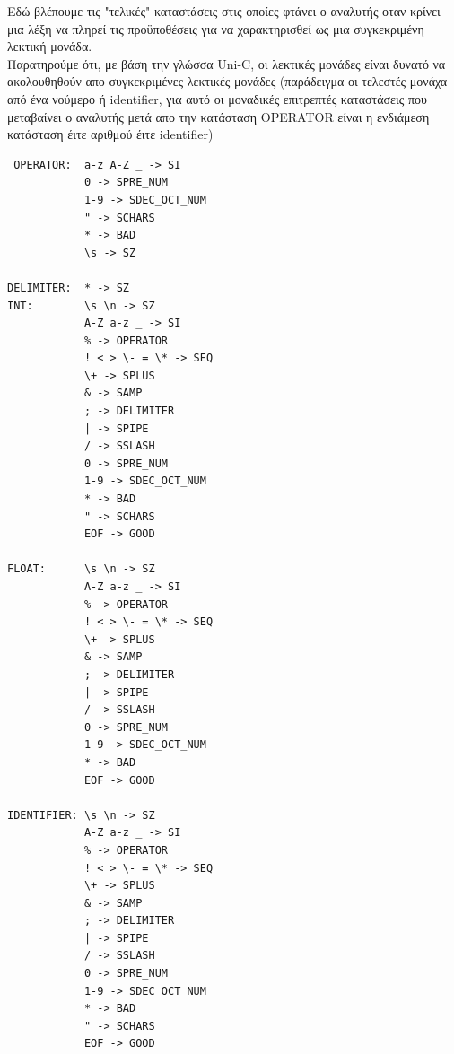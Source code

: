\documentclass[14pt]{extarticle}
\begin{document}
Εδώ βλέπουμε τις "τελικές" καταστάσεις στις οποίες φτάνει ο αναλυτής οταν κρίνει μια λέξη να πληρεί τις προϋποθέσεις για να χαρακτηρισθεί ως μια συγκεκριμένη λεκτική μονάδα.
\\
Παρατηρούμε ότι, με βάση την γλώσσα \textlatin{Uni-C}, οι λεκτικές μονάδες είναι δυνατό να ακολουθηθούν απο συγκεκριμένες λεκτικές μονάδες (παράδειγμα οι τελεστές μονάχα από ένα νούμερο ή \textlatin{identifier}, για αυτό οι μοναδικές επιτρεπτές καταστάσεις που μεταβαίνει ο αναλυτής μετά απο την κατάσταση \textlatin{OPERATOR} είναι η ενδιάμεση κατάσταση έιτε αριθμού έιτε \textlatin{identifier}) 
    \begin{lstlisting}
 OPERATOR:  a-z A-Z _ -> SI
            0 -> SPRE_NUM
            1-9 -> SDEC_OCT_NUM    
            " -> SCHARS
            * -> BAD
            \s -> SZ

DELIMITER:  * -> SZ
INT:        \s \n -> SZ
            A-Z a-z _ -> SI
            % -> OPERATOR
            ! < > \- = \* -> SEQ
            \+ -> SPLUS
            & -> SAMP
            ; -> DELIMITER
            | -> SPIPE
            / -> SSLASH
            0 -> SPRE_NUM
            1-9 -> SDEC_OCT_NUM
            * -> BAD
            " -> SCHARS
            EOF -> GOOD

FLOAT:      \s \n -> SZ
            A-Z a-z _ -> SI
            % -> OPERATOR
            ! < > \- = \* -> SEQ
            \+ -> SPLUS
            & -> SAMP
            ; -> DELIMITER
            | -> SPIPE
            / -> SSLASH
            0 -> SPRE_NUM
            1-9 -> SDEC_OCT_NUM
            * -> BAD
            EOF -> GOOD
    
IDENTIFIER: \s \n -> SZ
            A-Z a-z _ -> SI
            % -> OPERATOR
            ! < > \- = \* -> SEQ
            \+ -> SPLUS
            & -> SAMP
            ; -> DELIMITER
            | -> SPIPE
            / -> SSLASH
            0 -> SPRE_NUM
            1-9 -> SDEC_OCT_NUM
            * -> BAD
            " -> SCHARS
            EOF -> GOOD


    \end{lstlisting}
\end{document}
